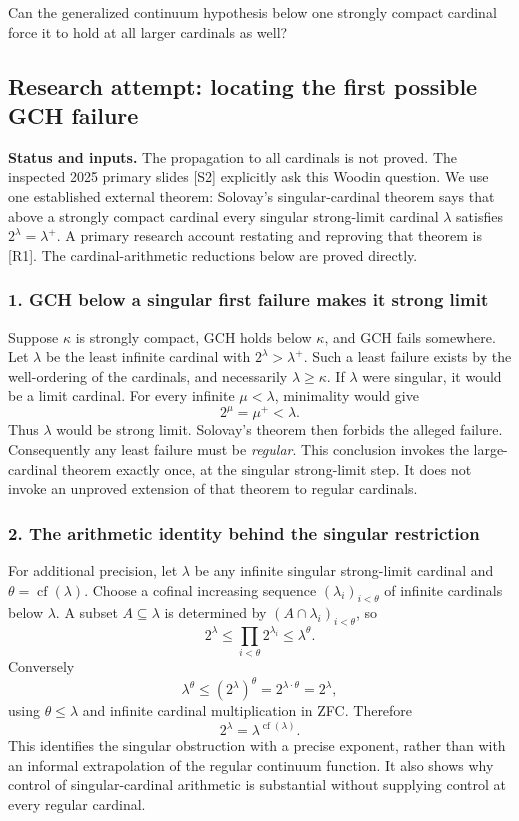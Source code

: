 \documentclass[11pt,a4paper]{article}
\begin{document}
Can the generalized continuum hypothesis below one strongly compact cardinal force it to hold at all larger cardinals as well?

\subsection{Research attempt: locating the first possible GCH failure}
\textbf{Status and inputs.} The propagation to all cardinals is not proved. The inspected 2025 primary slides [S2] explicitly ask this Woodin question. We use one established external theorem: Solovay's singular-cardinal theorem says that above a strongly compact cardinal every singular strong-limit cardinal $\lambda$ satisfies $2^\lambda=\lambda^+$. A primary research account restating and reproving that theorem is [R1]. The cardinal-arithmetic reductions below are proved directly.

\subsubsection{1. GCH below a singular first failure makes it strong limit}
Suppose $\kappa$ is strongly compact, GCH holds below $\kappa$, and GCH fails somewhere. Let $\lambda$ be the least infinite cardinal with $2^\lambda>\lambda^+$. Such a least failure exists by the well-ordering of the cardinals, and necessarily $\lambda\geq\kappa$. If $\lambda$ were singular, it would be a limit cardinal. For every infinite $\mu<\lambda$, minimality would give
\[2^\mu=\mu^+<\lambda.\]
Thus $\lambda$ would be strong limit. Solovay's theorem then forbids the alleged failure. Consequently any least failure must be \emph{regular}. This conclusion invokes the large-cardinal theorem exactly once, at the singular strong-limit step. It does not invoke an unproved extension of that theorem to regular cardinals.

\subsubsection{2. The arithmetic identity behind the singular restriction}
For additional precision, let $\lambda$ be any infinite singular strong-limit cardinal and $\theta=\operatorname{cf}(\lambda)$. Choose a cofinal increasing sequence $(\lambda_i)_{i<\theta}$ of infinite cardinals below $\lambda$. A subset $A\subseteq\lambda$ is determined by $(A\cap\lambda_i)_{i<\theta}$, so
\[2^\lambda\leq\prod_{i<\theta}2^{\lambda_i}\leq\lambda^\theta.
\]
Conversely
\[\lambda^\theta\leq(2^\lambda)^\theta
=2^{\lambda\cdot\theta}=2^\lambda,
\]
using $\theta\leq\lambda$ and infinite cardinal multiplication in ZFC. Therefore
\[2^\lambda=\lambda^{\operatorname{cf}(\lambda)}.\tag{1}\]
This identifies the singular obstruction with a precise exponent, rather than with an informal extrapolation of the regular continuum function. It also shows why control of singular-cardinal arithmetic is substantial without supplying control at every regular cardinal.
\end{document}
